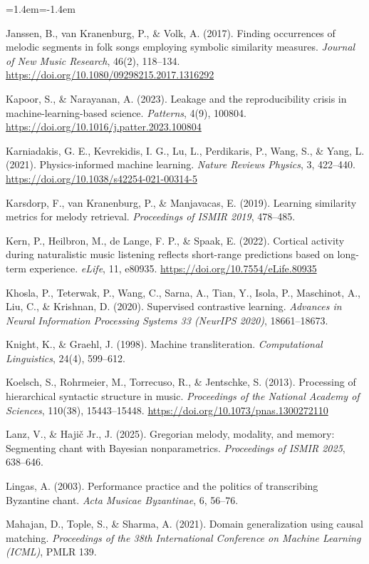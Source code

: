 \documentclass[11pt,a4paper]{article}
\newenvironment{reflist}{\begin{list}{}{\leftmargin=1.4em\itemindent=-1.4em\itemsep=0.8pt\parsep=0pt}\small}{\end{list}}
\begin{document}
\begin{otherlanguage}{english}
\begin{reflist}
\item Janssen, B., van Kranenburg, P., \& Volk, A. (2017). Finding occurrences of melodic segments in folk songs employing symbolic similarity measures. \emph{Journal of New Music Research}, 46(2), 118--134. \url{https://doi.org/10.1080/09298215.2017.1316292}
\item Kapoor, S., \& Narayanan, A. (2023). Leakage and the reproducibility crisis in machine-learning-based science. \emph{Patterns}, 4(9), 100804. \url{https://doi.org/10.1016/j.patter.2023.100804}
\item Karniadakis, G. E., Kevrekidis, I. G., Lu, L., Perdikaris, P., Wang, S., \& Yang, L. (2021). Physics-informed machine learning. \emph{Nature Reviews Physics}, 3, 422--440. \url{https://doi.org/10.1038/s42254-021-00314-5}
\item Karsdorp, F., van Kranenburg, P., \& Manjavacas, E. (2019). Learning similarity metrics for melody retrieval. \emph{Proceedings of ISMIR 2019}, 478--485.
\item Kern, P., Heilbron, M., de Lange, F. P., \& Spaak, E. (2022). Cortical activity during naturalistic music listening reflects short-range predictions based on long-term experience. \emph{eLife}, 11, e80935. \url{https://doi.org/10.7554/eLife.80935}
\item Khosla, P., Teterwak, P., Wang, C., Sarna, A., Tian, Y., Isola, P., Maschinot, A., Liu, C., \& Krishnan, D. (2020). Supervised contrastive learning. \emph{Advances in Neural Information Processing Systems 33 (NeurIPS 2020)}, 18661--18673.
\item Knight, K., \& Graehl, J. (1998). Machine transliteration. \emph{Computational Linguistics}, 24(4), 599--612.
\item Koelsch, S., Rohrmeier, M., Torrecuso, R., \& Jentschke, S. (2013). Processing of hierarchical syntactic structure in music. \emph{Proceedings of the National Academy of Sciences}, 110(38), 15443--15448. \url{https://doi.org/10.1073/pnas.1300272110}
\item Lanz, V., \& Hajič Jr., J. (2025). Gregorian melody, modality, and memory: Segmenting chant with Bayesian nonparametrics. \emph{Proceedings of ISMIR 2025}, 638--646.
\item Lingas, A. (2003). Performance practice and the politics of transcribing Byzantine chant. \emph{Acta Musicae Byzantinae}, 6, 56--76.
\item Mahajan, D., Tople, S., \& Sharma, A. (2021). Domain generalization using causal matching. \emph{Proceedings of the 38th International Conference on Machine Learning (ICML)}, PMLR 139.

\end{reflist}
\end{otherlanguage}
\end{document}
